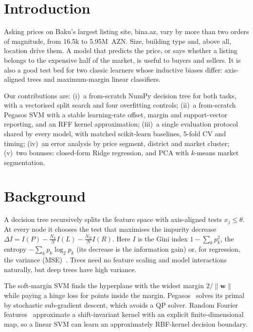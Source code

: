 \documentclass[10pt,twocolumn,a4paper]{article}
\begin{document}
\section{Introduction}
Asking prices on Baku's largest listing site, bina.az, vary by more than
two orders of magnitude, from 16.5k to 5.95M~AZN. Size, building type
and, above all, location drive them. A model that predicts the price, or
says whether a listing belongs to the expensive half of the market, is
useful to buyers and sellers. It is also a good test bed for two classic
learners whose inductive biases differ: axis-aligned trees and
maximum-margin linear classifiers.

Our contributions are:
(i)~a from-scratch NumPy decision tree for both tasks, with a vectorised
split search and four overfitting controls;
(ii)~a from-scratch Pegasos SVM with a stable learning-rate offset, margin
and support-vector reporting, and an RFF kernel approximation;
(iii)~a single evaluation protocol shared by every model, with matched
scikit-learn baselines, 5-fold CV and timing;
(iv)~an error analysis by price segment, district and market cluster;
(v)~two bonuses: closed-form Ridge regression, and PCA with $k$-means
market segmentation.

\section{Background}
A decision tree recursively splits the feature space with axis-aligned
tests $x_j\le\theta$. At every node it chooses the test that maximises
the impurity decrease
$\Delta I=I(P)-\tfrac{N_L}{N}I(L)-\tfrac{N_R}{N}I(R)$. Here $I$ is the Gini
index $1-\sum_k p_k^2$, the entropy $-\sum_k p_k\log_2p_k$ (its decrease
is the information gain) or, for regression, the variance (MSE)~\cite{cart}.
Trees need no feature scaling and model interactions naturally, but deep
trees have high variance.

The soft-margin SVM finds the hyperplane with the widest margin
$2/\lVert\mathbf w\rVert$ while paying a hinge loss for points inside the
margin. Pegasos~\cite{pegasos} solves its primal by stochastic
sub-gradient descent, which avoids a QP solver. Random Fourier
features~\cite{rff} approximate a shift-invariant kernel with an explicit
finite-dimensional map, so a linear SVM can learn an approximately
RBF-kernel decision boundary.

\end{document}
